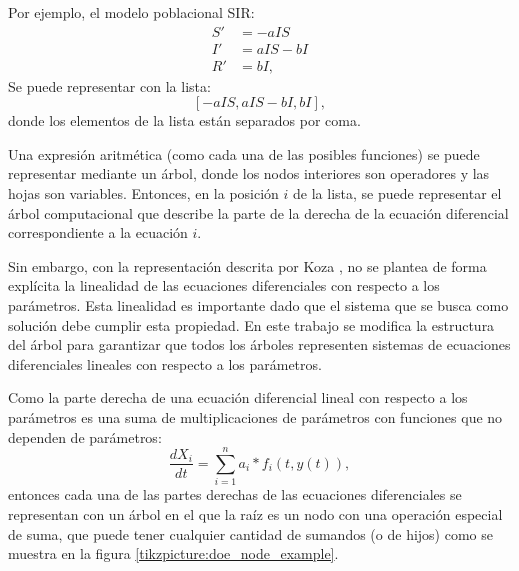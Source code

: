 Por ejemplo, el modelo poblacional SIR:
\begin{align*}
    S' & = - aIS    \\
    I' & = aIS - bI \\
    R' & = bI,
\end{align*}
Se puede representar con la lista:
$$[-aIS, aIS - bI, bI],$$
donde los elementos de la lista están separados por coma.

Una expresión aritmética (como cada una de las posibles funciones) se puede representar mediante un árbol, donde los nodos interiores son operadores y las hojas son variables. Entonces, en la posición $i$ de la lista, se puede representar el árbol computacional que describe la parte de la derecha de la ecuación diferencial correspondiente a la ecuación $i$.

Sin embargo, con la representación descrita por Koza \cite{zelinka2005analytic}, no se plantea de forma explícita la linealidad de las ecuaciones diferenciales con respecto a los parámetros. Esta linealidad es importante dado que el sistema que se busca como solución debe cumplir esta propiedad. En este trabajo se modifica la estructura del árbol para garantizar que todos los árboles representen sistemas de ecuaciones diferenciales lineales con respecto a los parámetros.

Como la parte derecha de una ecuación diferencial lineal con respecto a los parámetros es una suma de multiplicaciones de parámetros con funciones que no dependen de parámetros:
$$\frac{dX_i}{dt} = \sum_{i=1}^{n} a_i * f_i(t, y(t)),$$
entonces cada una de las partes derechas de las ecuaciones diferenciales se representan con un árbol en el que la raíz es un nodo con una operación especial de suma, que puede tener cualquier cantidad de sumandos (o de hijos) como se muestra en la figura \ref{tikzpicture:doe_node_example}.



